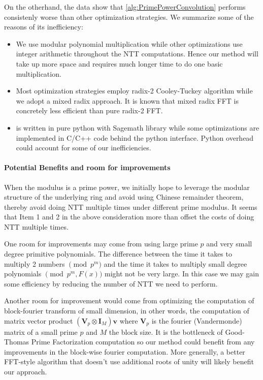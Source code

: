On the otherhand, the data show that \cref{alg:PrimePowerConvolution} performs consistenly worse than other optimization strategies. We summarize some of the reasons of its inefficiency:
\begin{itemize}
    \item We use modular polynomial multiplication while other optimizations use integer arithmetic throughout the NTT computations. Hence our method will take up more space and requires much longer time to do one basic multiplication.
    \item Most optimization strategies employ radix-2 Cooley-Tuckey algorithm while we adopt a mixed radix approach. It is known that mixed radix FFT is concretely less efficient than pure radix-2 FFT.
    \item {} is written in pure python with Sagemath library while some optimizations are implemented in C/C++ code behind the python interface. Python overhead could account for some of our inefficiencies.
\end{itemize}

\paragraph{Potential Benefits and room for improvements}
When the modulus is a prime power, we initially hope to leverage the modular structure of the underlying ring and avoid using Chinese remainder theorem, thereby avoid doing NTT multiple times under different prime modulus. It seems that Item 1 and 2 in the above consideration more than offset the costs of doing NTT multiple times. 

One room for improvements may come from using large prime \(p\) and very small degree primitive polynomials. The difference between the time it takes to multiply 2 numbers \(\pmod{p^m}\) and the time it takes to multiply small degree polynomials \(\pmod{p^m, F(x)}\) might not be very large. In this case we may gain some efficiency by reducing the number of NTT we need to perform.

Another room for improvement would come from optimizing the computation of block-fourier transform of small dimension, in other words, the computation of matrix vector product \((\bm{V}_p \otimes \bm{I}_{M}) \bm{v}\) where \(\bm{V}_p\) is the fourier (Vandermonde) matrix of a small prime \(p\) and \(M\) the block size. It is the bottleneck of Good-Thomas Prime Factorization computation so our method could benefit from any improvements in the block-wise fourier computation. More generally, a better FFT-style algorithm that doesn't use additional roots of unity will likely benefit our approach.